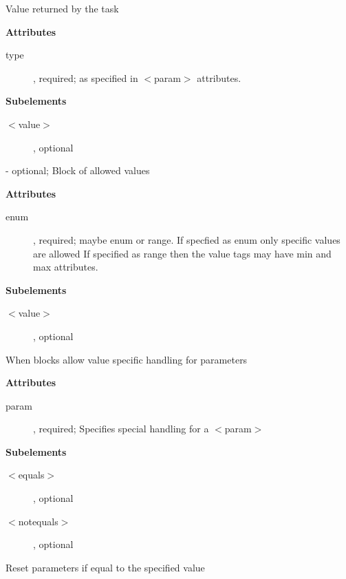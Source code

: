 \begin{description}
Value returned by the task
\begin{description}
\item \textbf{Attributes}
\begin{description}
\item [type], required; as specified in $<$param$>$ attributes.
\end{description}
\item \textbf{Subelements}
\begin{description}
\item [$<$value$>$], optional
\end{description}
\end{description}
\item [$<$allowed$>$] - optional;
Block of allowed values
\begin{description}
\item \textbf{Attributes}
\begin{description}
\item [enum], required; maybe enum or range. If specfied as enum only specific values are allowed
If specified as range then the value tags may have min and max attributes.
\end{description}
\item \textbf{Subelements}
\begin{description}
\item [$<$value$>$], optional
\end{description}
\end{description}
\item [$<$when$>$ - optional]
When blocks allow value specific handling for parameters
\begin{description}
\item \textbf{Attributes}
\begin{description}
\item [param], required; Specifies special handling for a $<$param$>$
\end{description}
\item \textbf{Subelements}
\begin{description}
\item [$<$equals$>$], optional
\item [$<$notequals$>$], optional
\end{description}
\end{description}
\item [$<$equals$>$ - optional]
Reset parameters if equal to the specified value
\begin{description}

\end{description}
\end{description}
